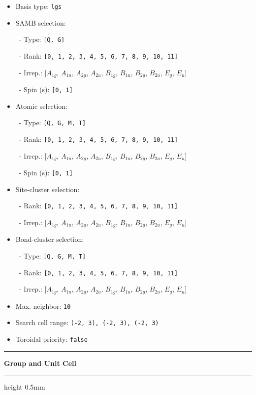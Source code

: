 \documentclass[fleqn,10pt,landscape]{jsarticle}
\begin{document}
\begin{itemize}
\item Basis type: \texttt{lgs}

\item SAMB selection:

\, - Type: \texttt{[Q, G]}

\, - Rank: \texttt{[0, 1, 2, 3, 4, 5, 6, 7, 8, 9, 10, 11]}

\, - Irrep.: [$A_{1g}$, $A_{1u}$, $A_{2g}$, $A_{2u}$, $B_{1g}$, $B_{1u}$, $B_{2g}$, $B_{2u}$, $E_{g}$, $E_{u}$]

\, - Spin (s): \texttt{[0, 1]}

\item Atomic selection:

\, - Type: \texttt{[Q, G, M, T]}

\, - Rank: \texttt{[0, 1, 2, 3, 4, 5, 6, 7, 8, 9, 10, 11]}

\, - Irrep.: [$A_{1g}$, $A_{1u}$, $A_{2g}$, $A_{2u}$, $B_{1g}$, $B_{1u}$, $B_{2g}$, $B_{2u}$, $E_{g}$, $E_{u}$]

\, - Spin (s): \texttt{[0, 1]}

\item Site-cluster selection:

\, - Rank: \texttt{[0, 1, 2, 3, 4, 5, 6, 7, 8, 9, 10, 11]}

\, - Irrep.: [$A_{1g}$, $A_{1u}$, $A_{2g}$, $A_{2u}$, $B_{1g}$, $B_{1u}$, $B_{2g}$, $B_{2u}$, $E_{g}$, $E_{u}$]

\item Bond-cluster selection:

\, - Type: \texttt{[Q, G, M, T]}

\, - Rank: \texttt{[0, 1, 2, 3, 4, 5, 6, 7, 8, 9, 10, 11]}

\, - Irrep.: [$A_{1g}$, $A_{1u}$, $A_{2g}$, $A_{2u}$, $B_{1g}$, $B_{1u}$, $B_{2g}$, $B_{2u}$, $E_{g}$, $E_{u}$]

\item Max. neighbor: \texttt{10}

\item Search cell range: \texttt{(-2, 3), (-2, 3), (-2, 3)}

\item Toroidal priority: \texttt{false}

\end{itemize}
\vspace{5mm}
\noindent \rule[0.5mm]{5mm}{0.5mm}\hspace{3mm}\textbf{Group and Unit Cell}\hspace{3mm}\leaders\hrule height 0.5mm\hfill\kern0pt
\vspace{3mm}
\end{document}
